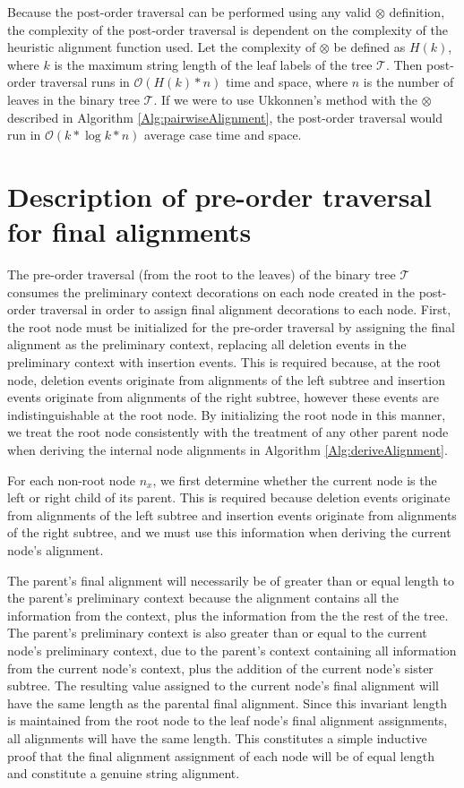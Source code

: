 \documentclass{bmcart}
\begin{document}
Because the post-order traversal can be performed using any valid  $\otimes$ definition, the complexity of the post-order traversal is dependent on the complexity of the heuristic alignment function used.
Let the complexity of $\otimes$ be defined as $H(k)$, where $k$ is the maximum string length of the leaf labels of the tree $\mathcal{T}$.
Then post-order traversal runs in $\mathcal{O}(H(k) * n)$ time and space, where $n$ is the number of leaves in the binary tree $\mathcal{T}$.
If we were to use Ukkonnen's method with the $\otimes$ described in Algorithm \ref{Alg:pairwiseAlignment}, the post-order traversal would run in $\mathcal{O}(k * \log  k * n)$ average case time and space.


\section*{Description of pre-order traversal for final alignments}

The pre-order traversal (from the root to the leaves) of the binary tree $\mathcal{T}$ consumes the preliminary context decorations on each node created in the post-order traversal in order to assign final alignment decorations to each node.
First, the root node must be initialized for the pre-order traversal by assigning the final alignment as the preliminary context, replacing all deletion events in the preliminary context with insertion events.
This is required because, at the root node, deletion events originate from alignments of the left subtree and insertion events originate from alignments of the right subtree, however these events are indistinguishable at the root node.
By initializing the root node in this manner, we treat the root node consistently with the treatment of any other parent node when deriving the internal node alignments in Algorithm \ref{Alg:deriveAlignment}.

For each non-root node $n_x$, we first determine whether the current node is the left or right child of its parent.
This is required because deletion events originate from alignments of the left subtree and insertion events originate from alignments of the right subtree, and we must use this information when deriving the current node's alignment.

The parent's final alignment will necessarily be of greater than or equal length to the parent's preliminary context because the alignment contains all the information from the context, plus the information from the the rest of the tree.
The parent's preliminary context is also greater than or equal to the current node's preliminary context, due to the parent's context containing all information from the current node's context, plus the addition of the current node's sister subtree.
The resulting value assigned to the current node's final alignment will have the same length as the parental final alignment.
Since this invariant length is maintained from the root node to the leaf node's final alignment assignments, all alignments will have the same length.
This constitutes a simple inductive proof that the final alignment assignment of each node will be of equal length and constitute a genuine string alignment.
\end{document}

